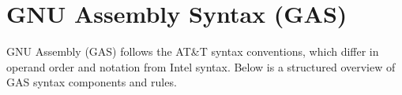 \section{GNU Assembly Syntax (GAS)}

GNU Assembly (GAS) follows the AT\&T syntax conventions, which differ in operand order and notation from Intel syntax. Below is a structured overview of GAS syntax components and rules.
